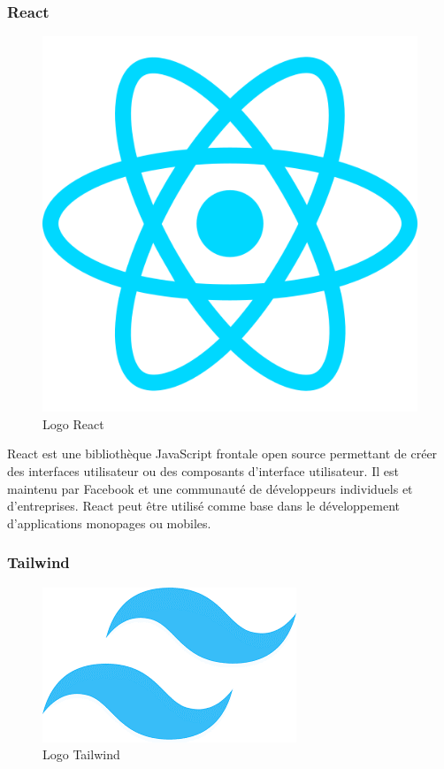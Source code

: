 \subsubsection{React}


\begin{figure}[H]
    \centering
    \includegraphics[scale=0.2]{Logos/react.png}
    \caption{Logo React}
\end{figure}

React est une bibliothèque JavaScript frontale open
source permettant de créer des interfaces utilisateur ou des
composants d’interface utilisateur. Il est maintenu par Facebook et une communauté de développeurs individuels et
d’entreprises. React peut être utilisé comme base dans le développement d’applications monopages ou mobiles.

\subsubsection{Tailwind}

\begin{figure}[H]
    \centering
    \includegraphics[scale=0.5]{Logos/tailwind.png}
    \caption{Logo Tailwind}
\end{figure}

